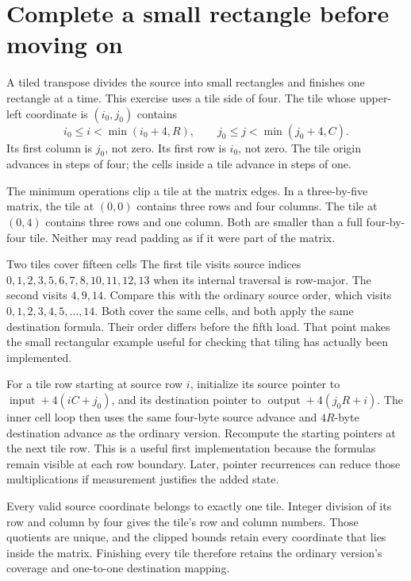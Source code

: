 \section{Complete a small rectangle before moving on}
A tiled transpose divides the source into small rectangles and finishes one
rectangle at a time. This exercise uses a tile side of four. The tile whose
upper-left coordinate is \((i_0,j_0)\) contains
\[
  i_0\leq i<\min(i_0+4,R),\qquad
  j_0\leq j<\min(j_0+4,C).
\]
Its first column is \(j_0\), not zero. Its first row is \(i_0\), not zero.
The tile origin advances in steps of four; the cells inside a tile advance in
steps of one.

The minimum operations clip a tile at the matrix edges. In a three-by-five
matrix, the tile at \((0,0)\) contains three rows and four columns. The tile
at \((0,4)\) contains three rows and one column. Both are smaller than a full
four-by-four tile. Neither may read padding as if it were part of the matrix.

\begin{MARSWorkedExample}{Two tiles cover fifteen cells}
  The first tile visits source indices
  \(0,1,2,3,5,6,7,8,10,11,12,13\) when its internal traversal is row-major.
  The second visits \(4,9,14\). Compare this with the ordinary source order,
  which visits \(0,1,2,3,4,5,\ldots,14\). Both cover the same cells, and both
  apply the same destination formula. Their order differs before the fifth load.
  That point makes the small rectangular example useful for checking that tiling
  has actually been implemented.
\end{MARSWorkedExample}

For a tile row starting at source row \(i\), initialize its source pointer to
\(\operatorname{input}+4(iC+j_0)\), and its destination pointer to
\(\operatorname{output}+4(j_0R+i)\). The inner cell loop then uses the same
four-byte source advance and \(4R\)-byte destination advance as the ordinary
version. Recompute the starting pointers at the next tile row. This is a useful
first implementation because the formulas remain visible at each row boundary.
Later, pointer recurrences can reduce those multiplications if measurement
justifies the added state.

Every valid source coordinate belongs to exactly one tile. Integer division of
its row and column by four gives the tile's row and column numbers. Those
quotients are unique, and the clipped bounds retain every coordinate that lies
inside the matrix. Finishing every tile therefore retains the ordinary
version's coverage and one-to-one destination mapping.

